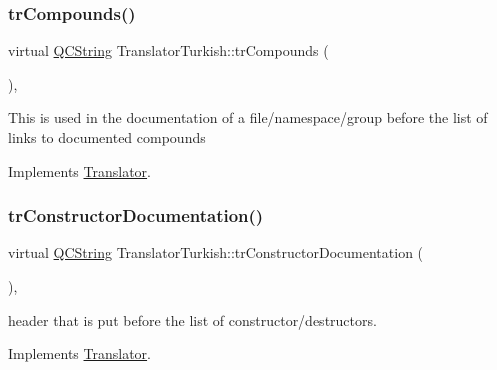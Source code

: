\mbox{\label{class_translator_turkish_a88fd251545d1067c06b2077596f63fff}} 
\subsubsection{\texorpdfstring{trCompounds()}{trCompounds()}}
{\footnotesize\ttfamily virtual \mbox{\hyperlink{class_q_c_string}{Q\+C\+String}} Translator\+Turkish\+::tr\+Compounds (\begin{DoxyParamCaption}{ }\end{DoxyParamCaption})\hspace{0.3cm}{\ttfamily [inline]}, {\ttfamily [virtual]}}

This is used in the documentation of a file/namespace/group before the list of links to documented compounds 

Implements \mbox{\hyperlink{class_translator}{Translator}}.

\mbox{\label{class_translator_turkish_a55fc2a6032b48c6e6a70ef3da2132120}} 
\subsubsection{\texorpdfstring{trConstructorDocumentation()}{trConstructorDocumentation()}}
{\footnotesize\ttfamily virtual \mbox{\hyperlink{class_q_c_string}{Q\+C\+String}} Translator\+Turkish\+::tr\+Constructor\+Documentation (\begin{DoxyParamCaption}{ }\end{DoxyParamCaption})\hspace{0.3cm}{\ttfamily [inline]}, {\ttfamily [virtual]}}

header that is put before the list of constructor/destructors. 

Implements \mbox{\hyperlink{class_translator}{Translator}}.

\mbox{\label{class_translator_turkish_a95ab6811492f0ef7ce30856b56a14e58}} 
